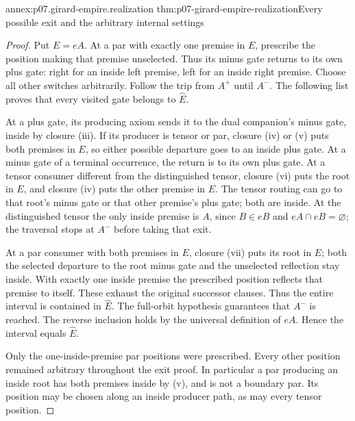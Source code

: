 \begin{annexitem}{annex:p07.girard-empire.realization}
 {thm:p07-girard-empire-realization}{Every possible exit and the arbitrary internal settings}
\begin{proof}
Put \(E=eA\). At a par with exactly one premise in \(E\), prescribe
the position making that premise unselected. Thus its minus gate
returns to its own plus gate: right for an inside left premise,
left for an inside right premise. Choose all other switches arbitrarily.
Follow the trip from \(A^+\) until \(A^-\).
The following list proves that every visited gate belongs to \(\widehat E\).

At a plus gate, its producing axiom sends it to the dual companion's
minus gate, inside by closure (iii). If its producer is tensor or par,
closure (iv) or (v) puts both premises in \(E\), so either possible
departure goes to an inside plus gate.
At a minus gate of a terminal occurrence, the return is to its own
plus gate. At a tensor consumer different from the distinguished
tensor, closure (vi) puts the root in \(E\), and closure (iv) puts
the other premise in \(E\). The tensor routing can go to that root's
minus gate or that other premise's plus gate; both are inside.
At the distinguished tensor the only inside premise is \(A\), since
\(B\in eB\) and \(eA\cap eB=\varnothing\); the traversal stops at
\(A^-\) before taking that exit.

At a par consumer with both premises in \(E\), closure (vii) puts
its root in \(E\); both the selected departure to the root minus
gate and the unselected reflection stay inside.
With exactly one inside premise the prescribed position reflects
that premise to itself. These exhaust the original successor clauses.
Thus the entire interval is contained in \(\widehat E\).
The full-orbit hypothesis guarantees that \(A^-\) is reached.
The reverse inclusion holds by the universal definition of \(eA\).
Hence the interval equals \(\widehat E\).

Only the one-inside-premise par positions were prescribed. Every
other position remained arbitrary throughout the exit proof.
In particular a par producing an inside root has both premises inside
by (v), and is not a boundary par. Its position may be chosen along
an inside producer path, as may every tensor position.
\end{proof}
\end{annexitem}

